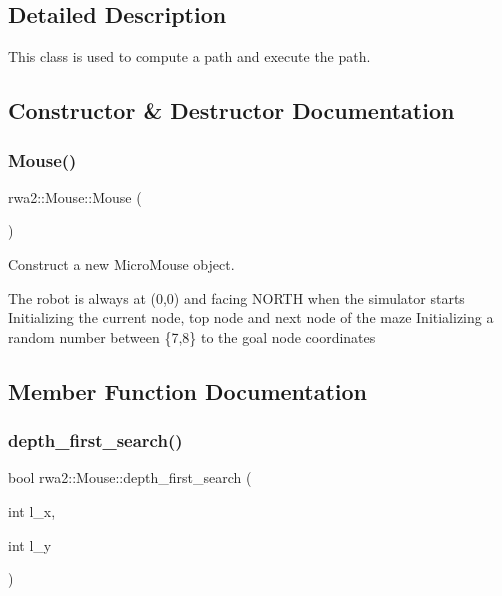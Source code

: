 \subsection{Detailed Description}
This class is used to compute a path and execute the path. 

\subsection{Constructor \& Destructor Documentation}
\mbox{\label{classrwa2_1_1_mouse_a048dffae3aaa3a6ddc2c6cc4741a097c}} 
\subsubsection{\texorpdfstring{Mouse()}{Mouse()}}
{\footnotesize\ttfamily rwa2\+::\+Mouse\+::\+Mouse (\begin{DoxyParamCaption}{ }\end{DoxyParamCaption})\hspace{0.3cm}{\ttfamily [inline]}}



Construct a new Micro\+Mouse object. 

The robot is always at (0,0) and facing N\+O\+R\+TH when the simulator starts Initializing the current node, top node and next node of the maze Initializing a random number between \{7,8\} to the goal node coordinates 

\subsection{Member Function Documentation}
\mbox{\label{classrwa2_1_1_mouse_a2f92de0dcd37dd4c47cc4bbda15dd81d}} 
\subsubsection{\texorpdfstring{depth\+\_\+first\+\_\+search()}{depth\_first\_search()}}
{\footnotesize\ttfamily bool rwa2\+::\+Mouse\+::depth\+\_\+first\+\_\+search (\begin{DoxyParamCaption}\item[{int}]{l\+\_\+x,  }\item[{int}]{l\+\_\+y }\end{DoxyParamCaption})}



